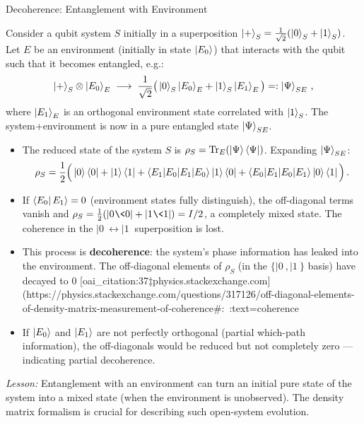 \begin{frame}{Decoherence: Entanglement with Environment}
  \begin{example}
    Consider a qubit system $S$ initially in a superposition $\ket{+}_S = \frac{1}{\sqrt{2}}(\ket{0}_S + \ket{1}_S)$. Let $E$ be an environment (initially in state $\ket{E_0}$) that interacts with the qubit such that it becomes entangled, e.g.:
    \[
      \ket{+}_S \otimes \ket{E_0}_E \;\longrightarrow\; \frac{1}{\sqrt{2}}\big(\ket{0}_S\ket{E_0}_E + \ket{1}_S\ket{E_1}_E\big) =: \ket{\Psi}_{SE}\,,
    \] 
    where $\ket{E_1}_E$ is an orthogonal environment state correlated with $\ket{1}_S$. The system+environment is now in a pure entangled state $\ket{\Psi}_{SE}$.
    \begin{itemize}
      \item The reduced state of the system $S$ is $\rho_S = \Tr_E(\ket{\Psi}\bra{\Psi})$. Expanding $\ket{\Psi}_{SE}$: 
        \[
           \rho_S = \frac{1}{2}\Big(\ket{0}\bra{0} + \ket{1}\bra{1} + \braket{E_1|E_0}\ket{1}\bra{0} + \braket{E_0|E_1}\ket{0}\bra{1}\Big)\,. 
        \] 
      \item If $\bra{E_0}E_1\rangle = 0$ (environment states fully distinguish), the off-diagonal terms vanish and $\rho_S = \frac{1}{2}(|0\>\!\<0| + |1\>\!\<1|) = I/2$, a completely mixed state. The coherence in the $|0\>\leftrightarrow|1\>$ superposition is lost.
      \item This process is \textbf{decoherence}: the system’s phase information has leaked into the environment. The off-diagonal elements of $\rho_S$ (in the $\{|0\>,|1\>\}$ basis) have decayed to 0 [oai_citation:37‡physics.stackexchange.com](https://physics.stackexchange.com/questions/317126/off-diagonal-elements-of-density-matrix-measurement-of-coherence#:~:text=coherence%
      \item If $\ket{E_0}$ and $\ket{E_1}$ are not perfectly orthogonal (partial which-path information), the off-diagonals would be reduced but not completely zero — indicating partial decoherence.
    \end{itemize}
  \end{example}
  \textit{Lesson:} Entanglement with an environment can turn an initial pure state of the system into a mixed state (when the environment is unobserved). The density matrix formalism is crucial for describing such open-system evolution.
\end{frame}

